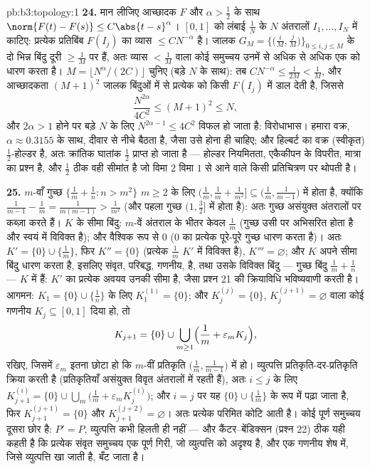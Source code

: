 \begin{solution}{pb:b3:topology:1}
\textbf{24.} मान लीजिए आच्छादक $F$ और $\alpha >
\frac12$ के साथ $\norm{F(t) - F(s)} \leq
C\abs{t-s}^\alpha$। $[0,1]$
को लंबाई $\frac1N$ के $N$ अंतरालों $I_1, \dots, I_N$ में काटिए: प्रत्येक प्रतिबिंब
$F(I_j)$ का व्यास $\leq
CN^{-\alpha}$ है। जालक $G_M =
\bigl\{\bigl(\frac iM, \frac jM\bigr)\bigr\}_{0 \leq i, j
\leq M}$ के दो भिन्न बिंदु दूरी $\geq \frac1M$
पर हैं, अतः व्यास $< \frac1M$ वाला कोई समुच्चय उनमें से अधिक से अधिक एक
को धारण करता है। $M =
\lfloor N^\alpha/(2C)\rfloor$ चुनिए (बड़े $N$ के साथ): तब $CN^{-\alpha} \leq \frac1{2M} < \frac1M$, और
आच्छादकता $(M+1)^2$ जालक बिंदुओं में से प्रत्येक को किसी $F(I_j)$ में डाल
देती है, जिससे
\[
\frac{N^{2\alpha}}{4C^2} \leq (M + 1)^2 \leq N,
\]
और $2\alpha > 1$ होने पर बड़े $N$ के लिए $N^{2\alpha - 1} \leq 4C^2$ विफल हो जाता है: विरोधाभास।
हमारा वक्र, $\alpha \approx
0.3155$ के साथ, दीवार से नीचे बैठता है, जैसा उसे होना ही
चाहिए; और हिल्बर्ट का वक्र (स्वीकृत) $\frac12$-होल्डर है, अतः क्रांतिक
घातांक $\frac12$ प्राप्त हो जाता है --- होल्डर नियमितता, एकैकीपन के
विपरीत, मात्रा का प्रश्न है, और $\frac12$ ठीक वही सीमांत है जो विमा
$2$ विमा $1$ से आने वाले किसी प्रतिचित्रण पर थोपती है।

\textbf{25.} $m$-वाँ गुच्छ $\{\frac1m + \frac1n : n >
m^2\}$ $m \geq 2$ के लिए $\bigl(\frac1m, \frac1m + \frac1{m^2}\bigr]
\subseteq \bigl(\frac1m, \frac1{m-1}\bigr)$ में होता है,
क्योंकि $\frac1{m-1} - \frac1m = \frac1{m(m-1)} >
\frac1{m^2}$ (और पहला गुच्छ $(1, \frac32]$ में होता है): अतः गुच्छ असंयुक्त
अंतरालों पर कब्ज़ा करते हैं। $K$ के सीमा बिंदु: $m$-वें अंतराल
के भीतर केवल $\frac1m$ (गुच्छ उसी पर अभिसरित होता है और स्वयं में विविक्त
है); और वैश्विक रूप से $0$ ($0$ का प्रत्येक  पूरे-पूरे
गुच्छ धारण करता है)। अतः $K'
= \{0\} \cup \{\frac1m\}$, फिर $K'' = \{0\}$ (प्रत्येक $\frac1m$ $K'$ में
विविक्त है), $K''' = \varnothing$; और $K$ अपने सीमा बिंदु धारण करता है, इसलिए
संवृत, परिबद्ध, गणनीय,  है, तथा उसके विविक्त बिंदु --- गुच्छ
बिंदु $\frac1m +
\frac1n$ --- $K$ में  हैं: $K'$ का प्रत्येक अवयव उनकी सीमा
है, जैसा प्रश्न 21 की क्रियाविधि भविष्यवाणी करती है। आगमन: $K_1 = \{0\}\cup\{\frac1n\}$
के लिए $K_1^{(1)} = \{0\}$; और $K_j^{(j)} =
\{0\}$, $K_j^{(j+1)} = \varnothing$ वाला कोई गणनीय  $K_j \subseteq [0, 1]$ दिया हो,
तो
\[
K_{j+1} = \{0\} \cup \bigcup_{m \geq 1}
\Bigl(\frac1m + \varepsilon_m K_j\Bigr),
\]
रखिए, जिसमें $\varepsilon_m$ इतना छोटा हो कि $m$-वीं प्रतिकृति $\bigl(\frac1m, \frac1{m-1}\bigr)$ में
हो। व्युत्पत्ति प्रतिकृति-दर-प्रतिकृति क्रिया करती है (प्रतिकृतियाँ
असंयुक्त विवृत अंतरालों में रहती हैं), अतः $i \leq j$ के लिए $K_{j+1}^{(i)} = \{0\} \cup \bigcup_m\bigl(\frac1m +
\varepsilon_mK_j^{(i)}\bigr)$; और
$i = j$ पर यह $\{0\} \cup \{\frac1m\}$ के रूप में पढ़ा जाता है, फिर $K_{j+1}^{(j+1)} =
\{0\}$ और $K_{j+1}^{(j+2)} = \varnothing$। अतः
प्रत्येक परिमित कोटि आती है। कोई पूर्ण समुच्चय दूसरा छोर है: $P' = P$,
व्युत्पत्ति कभी हिलती ही नहीं --- और कैंटर--बेंडिक्सन (प्रश्न 22)
ठीक यही कहती है कि प्रत्येक संवृत समुच्चय एक पूर्ण गिरी, जो व्युत्पत्ति
को अदृश्य है, और एक गणनीय शेष में, जिसे व्युत्पत्ति खा जाती है, बँट
जाता है।
\end{solution}

